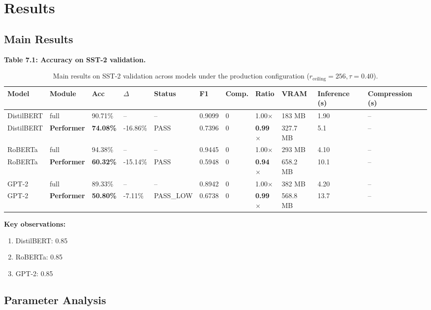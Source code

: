 
\section{Results}

\subsection{Main Results}

\textbf{Table 7.1: Accuracy on SST-2 validation.}

\begin{table}[t]
\centering
\small
\begin{tabular}{lllllllllll}
\toprule
\textbf{Model} & \textbf{Module} & \textbf{Acc} & \textbf{$\Delta$} & \textbf{Status} & \textbf{F1} & \textbf{Comp.} & \textbf{Ratio} & \textbf{VRAM} & \textbf{Inference (s)} & \textbf{Compression (s)} \\
\midrule
DistilBERT & full & 90.71\% & -- & -- & 0.9099 & 0 & 1.00$\times$ & 183 MB & 1.90 & -- \\
DistilBERT & \textbf{Performer} & \textbf{74.08\%} & -16.86\% & PASS & 0.7396 & 0 & \textbf{0.99$\times$} & 327.7 MB & 5.1 & -- \\
RoBERTa & full & 94.38\% & -- & -- & 0.9445 & 0 & 1.00$\times$ & 293 MB & 4.10 & -- \\
RoBERTa & \textbf{Performer} & \textbf{60.32\%} & -15.14\% & PASS & 0.5948 & 0 & \textbf{0.94$\times$} & 658.2 MB & 10.1 & -- \\
GPT-2 & full & 89.33\% & -- & -- & 0.8942 & 0 & 1.00$\times$ & 382 MB & 4.20 & -- \\
GPT-2 & \textbf{Performer} & \textbf{50.80\%} & -7.11\% & PASS_LOW & 0.6738 & 0 & \textbf{0.99$\times$} & 568.8 MB & 13.7 & -- \\
\bottomrule
\end{tabular}
\caption{Main results on SST-2 validation across models under the production configuration ($r_{\mathrm{ceiling}}=256, \tau=0.40$).}
\label{tab:main_sst2}
\end{table}

\textbf{Key observations:}

\begin{enumerate}
\item DistilBERT: 0.85
\item RoBERTa: 0.85
\item GPT-2: 0.85

\end{enumerate}
\subsection{Parameter Analysis}

